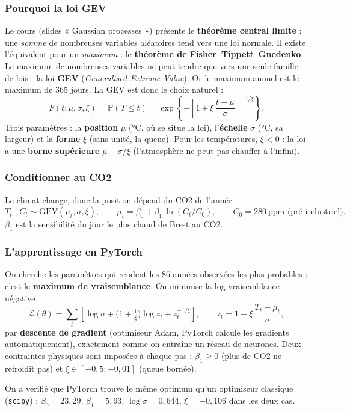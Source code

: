 \documentclass[11pt,a4paper]{article}
\newcommand{\f}[1]{\texttt{#1}}
\begin{document}
\subsubsection*{Pourquoi la loi GEV}
Le cours (slides « Gaussian processes ») présente le \textbf{théorème central limite} : une \emph{somme} de nombreuses variables aléatoires tend vers une loi normale. Il existe l'équivalent pour un \emph{maximum} : le \textbf{théorème de Fisher--Tippett--Gnedenko}. Le maximum de nombreuses variables ne peut tendre que vers une seule famille de lois : la loi \textbf{GEV} (\emph{Generalised Extreme Value}). Or le maximum annuel est le maximum de 365 jours. La GEV est donc le choix naturel :
\[
F(t;\mu,\sigma,\xi)=\mathbb P(T\le t)=\exp\left\{-\left[1+\xi\,\frac{t-\mu}{\sigma}\right]^{-1/\xi}\right\}.
\]
Trois paramètres : la \textbf{position} $\mu$ (°C, où se situe la loi), l'\textbf{échelle} $\sigma$ (°C, sa largeur) et la \textbf{forme} $\xi$ (sans unité, la queue). Pour les températures, $\xi<0$ : la loi a une \textbf{borne supérieure} $\mu-\sigma/\xi$ (l'atmosphère ne peut pas chauffer à l'infini).

\subsubsection*{Conditionner au CO2}
Le climat change, donc la position dépend du CO2 de l'année :
\[
T_t \mid C_t \sim \mathrm{GEV}(\mu_t,\sigma,\xi),\qquad \mu_t=\beta_0+\beta_1\,\ln(C_t/C_0),\qquad C_0=280\ \text{ppm (pré-industriel)}.
\]
$\beta_1$ est la sensibilité du jour le plus chaud de Brest au CO2.

\subsubsection*{L'apprentissage en PyTorch}
On cherche les paramètres qui rendent les 86 années observées les plus probables : c'est le \textbf{maximum de vraisemblance}. On minimise la log-vraisemblance négative
\[
\mathcal L(\theta)=\sum_t\left[\log\sigma+\Big(1+\tfrac1\xi\Big)\log z_t+z_t^{-1/\xi}\right],\qquad z_t=1+\xi\,\frac{T_t-\mu_t}{\sigma},
\]
par \textbf{descente de gradient} (optimiseur Adam, PyTorch calcule les gradients automatiquement), exactement comme on entraîne un réseau de neurones. Deux contraintes physiques sont imposées à chaque pas : $\beta_1\ge 0$ (plus de CO2 ne refroidit pas) et $\xi\in[-0{,}5;-0{,}01]$ (queue bornée).

On a vérifié que PyTorch trouve le même optimum qu'un optimiseur classique (\f{scipy}) : $\beta_0=23{,}29$, $\beta_1=5{,}93$, $\log\sigma=0{,}644$, $\xi=-0{,}106$ dans les deux cas.
\end{document}
